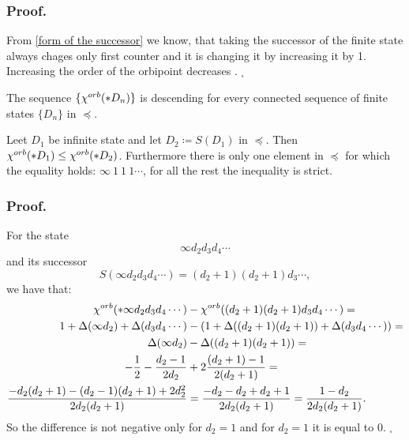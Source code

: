 \subsubsection{Proof.}
From \ref{form of the successor} we know, that taking the successor 
of the finite state always chages  
only first counter and it is changing it by increasing it by 1. 
Increasing the order of the orbipoint  
decreases \Eoc. $_\square$

\begin{corollary}\label{connected sequences corollary}
The sequence $\{{\chi^{orb}(*D_n)}\}$ is descending for every connected sequence 
of finite states $\{D_n\}$ in $\preceq$. 
\end{corollary}

\begin{lemma}
Leet $D_1$ be infinite state and let $D_2 \coloneqq S(D_1)$ in $\preceq$. 
Then ${\chi^{orb}(*D_1)} \leq {\chi^{orb}(*D_2)}$. Furthermore there is only one element in $\preceq$ for 
which the equality holds: $\infty\ 1\ 1\ 1\cdots$, for all the rest the inequality is strict. 
\end{lemma}
\subsubsection{Proof.}

For the state 
\begin{equation}
\infty d_2d_3d_4\cdots\end{equation} 
and its successor 
\begin{equation}
S(\infty d_2d_3d_4\cdots) = (d_2+1)(d_2+1)d_3\cdots,
\end{equation}
 we have that: 
\begin{align}
{\chi^{orb}(*\infty d_2d_3d_4\cdots)} &- {\chi^{orb}((d_2+1)(d_2+1)d_3d_4\cdots)} = \notag \\
1 + \Delta(\infty d_2) + \Delta(d_3d_4\cdots) &- 
(1 + \Delta((d_2+1)(d_2+1)) + \Delta(d_3d_4\cdots)) = \notag \\ 
\Delta(\infty d_2) &- \Delta((d_2+1)(d_2+1)) = \notag \\
-\frac{1}{2}- \frac{d_2-1}{2d_2} &+ 2\frac{(d_2+1)-1}{2(d_2+1)} =  \\
\frac{-d_2(d_2+1) - (d_2-1)(d_2+1) + 2d_2^2}{2d_2(d_2+1)}& = 
\frac{-d_2 -d_2 + d_2 +1 }{2d_2(d_2+1)} = 
\frac{1- d_2}{2d_2(d_2 + 1)}. \notag
\end{align}
So the difference is not negative only for $d_2 = 1$ and for $d_2 = 1$ it is equal 
to $0$. $_\square$ 

